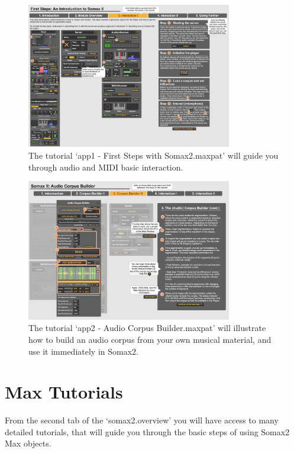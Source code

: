  \begin{figure}[H]
    \centering        
 	\includegraphics[width=0.8\textwidth]{img/app1_interaction.png}
    \caption{The tutorial `app1 - First Steps with Somax2.maxpat' will guide you through audio and MIDI basic interaction.}
    \label{fig:app1_interaction}
\end{figure}


 \begin{figure}[H]
    \centering        
 	\includegraphics[width=0.8\textwidth]{img/app2_audiocorpusbuilder.png}
    \caption{The tutorial `app2 - Audio Corpus Builder.maxpat' will illustrate how to build an audio corpus from your own musical material, and use it immediately in Somax2.}
    \label{fig:app2_audiocorpusbuilder}
\end{figure}



\section{Max Tutorials}

From the second tab of the `somax2.overview' you will have access to many detailed tutorials, that will guide you through the basic steps of using Somax2 Max objects. 

